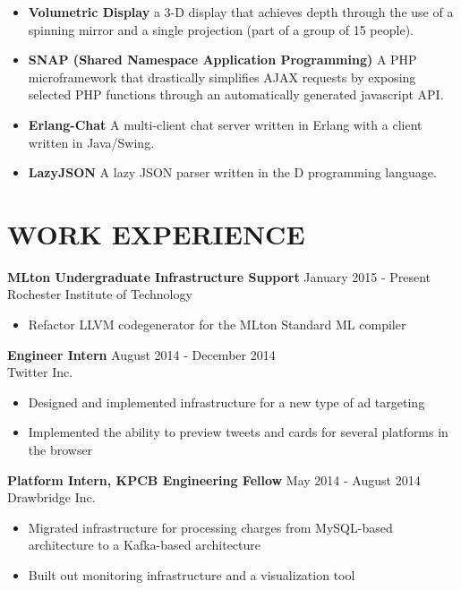 \documentclass[line,margin]{res}
\begin{document}
\begin{resume}
\begin{itemize}
\item {\bf Volumetric Display} a 3-D display that achieves depth through the
   use of a spinning mirror and a single projection
   (part of a group of 15 people).

\item {\bf SNAP (Shared Namespace Application Programming)}
   A PHP microframework that drastically simplifies AJAX requests by
   exposing selected PHP functions through an automatically generated
   javascript API.


\item {\bf Erlang-Chat}   A multi-client chat server written in Erlang with a
   client written in Java/Swing.



\item {\bf LazyJSON}  A lazy JSON parser written in the D programming language.


\end{itemize}

\section{WORK EXPERIENCE}

{\bf MLton Undergraduate Infrastructure Support} \hfill January 2015 - Present
  Rochester Institute of Technology
  \begin{itemize}
    \item Refactor LLVM codegenerator for the MLton Standard ML compiler
  \end{itemize}

{\bf Engineer Intern} \hfill August 2014 - December 2014 \\
  Twitter Inc.
  \begin{itemize}
  \item Designed and implemented infrastructure for a new type of ad targeting
  \item Implemented the ability to preview tweets and cards for several platforms in the browser
  \end{itemize}

{\bf Platform Intern, KPCB Engineering Fellow} \hfill May 2014 - August 2014 \\
    Drawbridge Inc.

    \begin{itemize}
    \item Migrated infrastructure for processing charges from MySQL-based architecture
    to a Kafka-based architecture
    \item Built out monitoring infrastructure and a visualization tool
    \end{itemize}


\end{resume}
\end{document}
